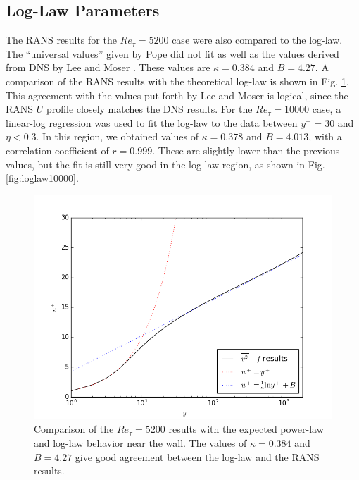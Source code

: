 \documentclass[a4paper,11pt]{article}
\begin{document}
\subsection{Log-Law Parameters}

The RANS results for the $Re_{\tau} = 5200$ case were also compared to the
log-law.  The ``universal values'' given by Pope \cite{pope} did not fit as well
as the values derived from DNS by Lee and Moser \cite{Lee}.  These values are $\kappa = 0.384$ and $B = 4.27$.  A comparison of the RANS results with the theoretical log-law is shown in Fig. \ref{fig:loglaw}. This agreement with the values put forth by Lee and Moser is logical, since the RANS $U$ profile closely matches the DNS results.
For the $Re_{\tau} = 10000$ case, a linear-log regression was used to fit the log-law to the data between $y^+ = 30$ and $\eta < 0.3$.  In this region, we obtained values of $\kappa = 0.378$ and $B = 4.013$, with a correlation coefficient of $r = 0.999$.  These are slightly lower than the previous values, but the fit is still very good in the log-law region, as shown in Fig. \ref{fig:loglaw10000}.

\begin{figure}
 \centering
 \includegraphics[width=\textwidth]{loglaw_5200}
 \caption{Comparison of the $Re_{\tau} = 5200$ results with the expected power-law and log-law behavior near the wall. The values of $\kappa = 0.384$ and $B = 4.27$ give good agreement between the log-law and the RANS results.}
 \label{fig:loglaw}
\end{figure}
\end{document}
